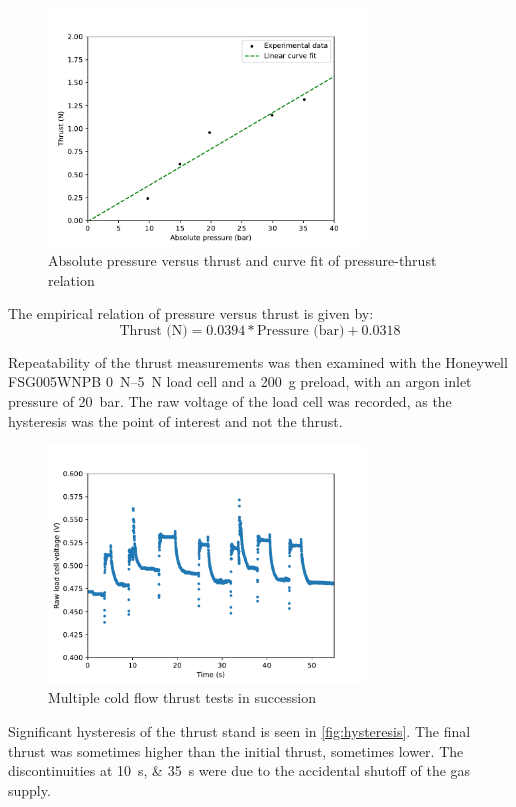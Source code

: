            \begin{figure}[!ht]
                \centering
                \includegraphics[width=0.75\textwidth]{assets/4 experiments/pressure-thrust graph.pdf}
                \caption{Absolute pressure versus thrust and curve fit of pressure-thrust relation}
                \label{fig:coldflow pressure-thrust}
            \end{figure}

            The empirical relation of pressure versus thrust is given by:
            \begin{equation}
                \text{Thrust (N)} = 0.0394*\text{Pressure (bar)} + 0.0318
            \end{equation}

            Repeatability of the thrust measurements was then examined with the Honeywell FSG005WNPB \qtyrange{0}{5}{N} load cell and a \qty{200}{g} preload, with an argon inlet pressure of \qty{20}{bar}. The raw voltage of the load cell was recorded, as the hysteresis was the point of interest and not the thrust.
            \begin{figure}[h]
                \centering
                \includegraphics[width=0.75\textwidth]{assets/4 experiments/hysterisis graph.pdf}
                \caption{Multiple cold flow thrust tests in succession}
                \label{fig:hysteresis}
            \end{figure}
            Significant hysteresis of the thrust stand is seen in \autoref{fig:hysteresis}. The final thrust was sometimes higher than the initial thrust, sometimes lower. The discontinuities at \qtylist{10;35}{s} were due to the accidental shutoff of the gas supply.

